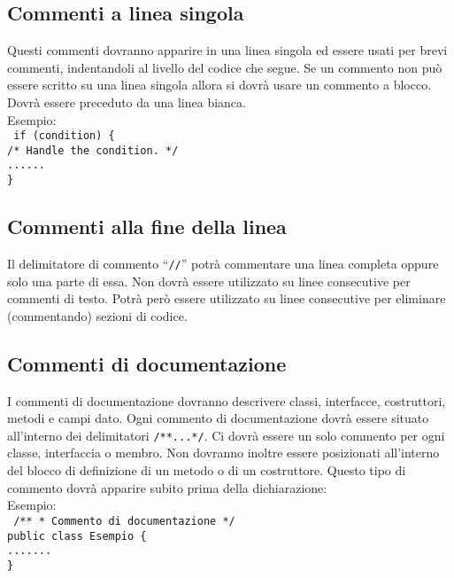 \subsection{Commenti a linea singola}
Questi commenti dovranno apparire in una linea singola ed essere usati per brevi commenti, indentandoli al livello del codice che segue. Se un commento non pu\`o essere scritto su una linea singola allora si dovr\`a usare un commento a blocco. Dovr\`a essere preceduto da una linea bianca. \\
 \newline
Esempio: \\
\texttt{
	if (condition) \{ \\
	\phantom{....}/* Handle the condition. */ \\
	\phantom{....}...... \\
	\}
} \\
 \newline
\subsection{Commenti alla fine della linea}
Il delimitatore di commento ``\texttt{//}'' potr\`a commentare una linea completa oppure solo una parte di essa. Non dovr\`a essere utilizzato su linee consecutive per commenti di testo. Potr\`a per\`o essere utilizzato su linee consecutive per eliminare (commentando) sezioni di codice.
\subsection{Commenti di documentazione}
I commenti di documentazione dovranno descrivere classi, interfacce, costruttori, metodi e campi dato. Ogni commento di documentazione dovr\`a essere situato all'interno dei delimitatori \texttt{/**...*/}. Ci dovr\`a essere un solo commento per ogni classe, interfaccia o membro. Non dovranno inoltre essere posizionati all'interno del blocco di definizione di un metodo o di un costruttore. Questo tipo di commento dovr\`a apparire subito prima della dichiarazione:\\
 \newline
Esempio:\\
 \newline
\texttt{
	/** \newline
	* Commento di documentazione \newline
	*/ \\
	public class Esempio \{ \\
	\phantom{....}....... \\
	\}
	\\
}
 \newline
